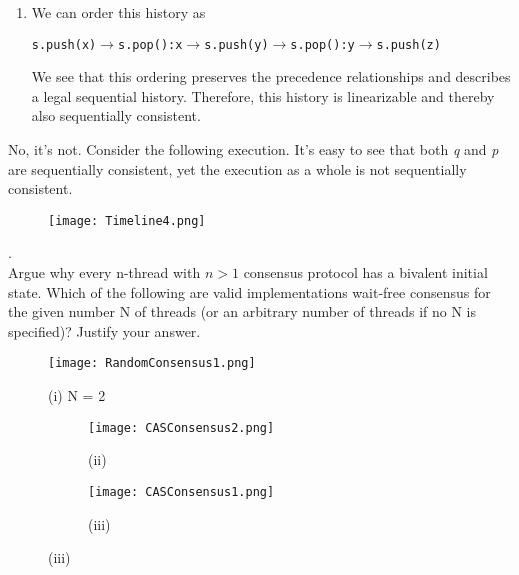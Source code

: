 \documentclass[main]{subfiles}
\begin{document}
\begin{ExerciseList}
\begin{enumerate}[label=(\roman*)]
                    \item We can order this history as
                        \begin{center}
                            \texttt{s.push(x)$\rightarrow$s.pop():x$\rightarrow$s.push(y)$\rightarrow$s.pop():y$\rightarrow$s.push(z)}
                        \end{center}
                        We see that this ordering preserves the precedence relationships and describes a legal sequential history. Therefore, this history is linearizable and thereby also sequentially consistent.
                \end{enumerate}
            \Question No, it's not. Consider the following execution. It's easy to see that both \textit{q} and \textit{p} are sequentially consistent, yet the execution as a whole is not sequentially consistent.
                \begin{figure}[H]
                    \centering
                    \texttt{[image: Timeline4.png]}
                \end{figure}
            
            
        \Exercise[title={Consensus},label=Cons].\quad \\
            \Question Argue why every n-thread with $n>1$ consensus protocol has a bivalent initial state.
            \Question Which of the following are valid implementations wait-free consensus for the given number N of threads (or an arbitrary number of threads if no N is specified)? Justify your answer.
                \begin{figure}[H]
                    \centering
                    \texttt{[image: RandomConsensus1.png]}
                    \captionsetup{labelformat=empty}
                    \caption{(i) N = 2}
                \end{figure}
                \begin{figure}[H]
                    \centering
                    \begin{subfigure}{.5\textwidth}
                        \centering
                        \vspace{-15pt}
                        \texttt{[image: CASConsensus2.png]}
                        \captionsetup{labelformat=empty}
                        \caption{(ii)}
                    \end{subfigure}%
                    \begin{subfigure}{.5\textwidth}
                        \centering
                        \vspace{-15pt}
                        \texttt{[image: CASConsensus1.png]}
                        \captionsetup{labelformat=empty}
                        \caption{(iii)}
                    \end{subfigure}
                \end{figure}
                

\end{ExerciseList}
\end{document}
